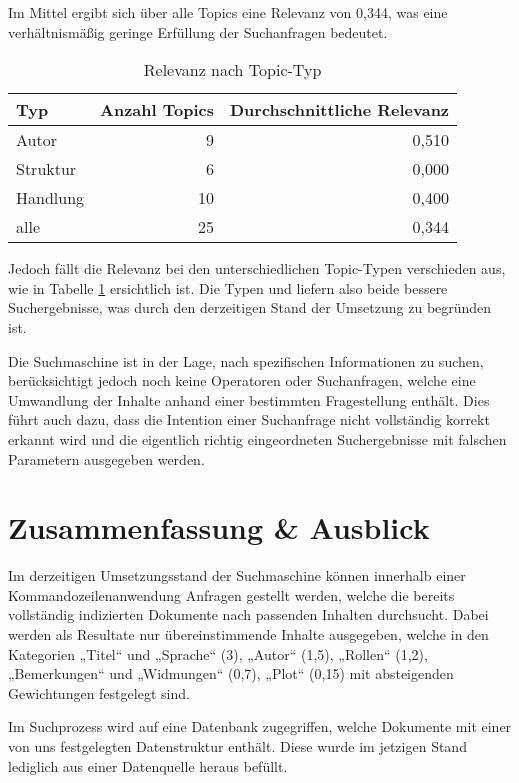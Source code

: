 Im Mittel ergibt sich über alle Topics eine Relevanz von 0,344,
was eine verhältnismäßig geringe Erfüllung der Suchanfragen bedeutet.
\begin{table}
    \centering
    \begin{tabular}{l r r}
        \toprule
        Typ & Anzahl Topics & Durchschnittliche Relevanz \\
        \midrule
        Autor & 9 & 0,510 \\
        Struktur & 6 & 0,000 \\
        Handlung & 10 & 0,400 \\
        alle & 25 & 0,344 \\
        \bottomrule
    \end{tabular}
    \caption{Relevanz nach Topic-Typ}
    \label{tab:rel-topic-type}
\end{table}
Jedoch fällt die Relevanz
bei den unterschiedlichen Topic-Typen verschieden aus,
wie in Tabelle \ref{tab:rel-topic-type} ersichtlich ist.
Die Typen  und 
liefern also beide bessere Suchergebnisse,
was durch den derzeitigen Stand der Umsetzung zu begründen ist.

Die Suchmaschine ist in der Lage, nach spezifischen Informationen zu suchen,
berücksichtigt jedoch noch keine Operatoren oder Suchanfragen,
welche eine Umwandlung der Inhalte
anhand einer bestimmten Fragestellung enthält.
Dies führt auch dazu, dass die Intention einer Suchanfrage
nicht vollständig korrekt erkannt wird
und die eigentlich richtig eingeordneten Suchergebnisse
mit falschen Parametern ausgegeben werden.

\section{Zusammenfassung \& Ausblick}
Im derzeitigen Umsetzungsstand der Suchmaschine
können innerhalb einer Kommandozeilenanwendung Anfragen gestellt werden,
welche die bereits vollständig indizierten Dokumente
nach passenden Inhalten durchsucht.
Dabei werden als Resultate nur übereinstimmende Inhalte ausgegeben,
welche in den Kategorien „Titel“ und „Sprache“ (3), „Autor“ (1,5),
„Rollen“ (1,2), „Bemerkungen“ und „Widmungen“ (0,7), „Plot“ (0,15)
mit absteigenden Gewichtungen festgelegt sind.

Im Suchprozess wird auf eine Datenbank zugegriffen,
welche Dokumente mit einer von uns festgelegten Datenstruktur enthält.
Diese wurde im jetzigen Stand lediglich aus einer Datenquelle heraus befüllt.


